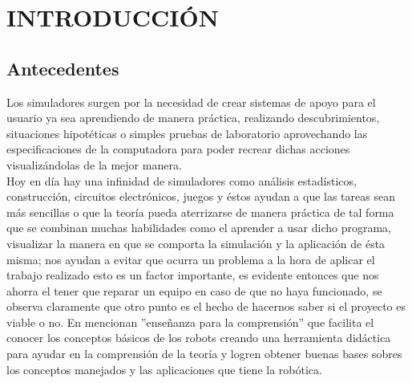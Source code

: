 \renewcommand\thechapter{\Roman{chapter}}
\chapter{INTRODUCCIÓN} \label{ch:intro} \thispagestyle{fancy} 
\renewcommand\thechapter{\arabic{chapter}}

\section{Antecedentes}
Los simuladores surgen por la necesidad de crear sistemas de apoyo para el usuario ya sea aprendiendo de manera práctica, realizando descubrimientos, situaciones hipotéticas o simples pruebas de laboratorio aprovechando las especificaciones de la computadora para poder recrear dichas acciones visualizándolas de la mejor manera.\\

Hoy en día hay una infinidad de simuladores como análisis estadísticos, construcción, circuitos electrónicos, juegos y éstos ayudan a que las tareas sean más sencillas o que la teoría pueda aterrizarse de manera práctica de tal forma que se combinan muchas habilidades como el aprender a usar dicho programa, visualizar la manera en que se comporta la simulación y la aplicación de ésta misma; nos ayudan a evitar que ocurra un problema a la hora de aplicar el trabajo realizado esto es un factor importante, es evidente entonces que nos ahorra el tener que reparar un equipo en caso de que no haya funcionado, se observa claramente que otro punto es el hecho de hacernos saber si el proyecto es viable o no. En \cite{moran-2009} mencionan ''enseñanza para la comprensión'' que facilita el conocer los conceptos básicos de los robots creando una herramienta didáctica para ayudar en la comprensión de la teoría y logren obtener buenas bases sobres los conceptos manejados y las aplicaciones que tiene la robótica.\\

